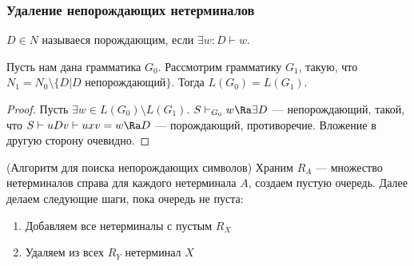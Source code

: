 \subsubsection{Удаление непорождающих нетерминалов}

\begin{definition}
    \(D \in N\) называеся порождающим, если \(\exists w: D \vdash w\).
\end{definition}

\begin{proposition}
    Пусть нам дана грамматика \(G_0\). Рассмотрим грамматику \(G_1\), такую, что \(N_1 = N_0 \setminus \{D | D \text{ непорождающий}\}\). Тогда \(L(G_0) = L(G_1)\).
\end{proposition}
\begin{proof}
    Пусть \(\exists w \in L(G_0) \setminus L(G_1)\). \(S \vdash_{G_0} w \Ra \exists D\) --- непорождающий, такой, что \(S \vdash uDv \vdash uxv = w \Ra D\) --- порождающий, противоречие. Вложение в другую сторону очевидно.
\end{proof}

\begin{note}(Алгоритм для поиска непорождающих символов)
    Храним \(R_A\) --- множество нетерминалов справа для каждого нетерминала \(A\), создаем пустую очередь. Далее делаем следующие шаги, пока очередь не пуста:
    \begin{enumerate}
        \item Добавляем все нетерминалы с пустым \(R_X\)
        \item Удаляем из всех \(R_Y\) нетерминал \(X\)
    \end{enumerate}
\end{note}
